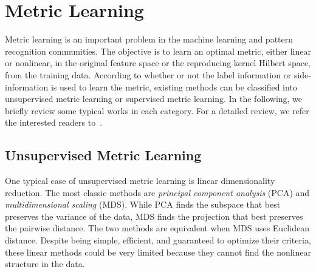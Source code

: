 
\section{Metric Learning}
\label{background:metric}
Metric learning is an important problem in the machine learning and pattern recognition communities. The objective is to learn an optimal metric, either linear or nonlinear, in the original feature space or the reproducing kernel Hilbert
space, from the training data. According to whether or not the label information or side-information is used to learn the metric, existing methods can be classified into unsupervised metric learning or supervised metric learning. In the following, we briefly review some typical works in each category. For a detailed review, we refer the interested readers to~\cite{yang2006tech}.

\subsection{Unsupervised Metric Learning}
One typical case of unsupervised metric learning is linear dimensionality reduction. The most classic methods are \textit{principal component analysis} (\mbox{PCA}) and \textit{multidimensional scaling} (\mbox{MDS}). While \mbox{PCA} finds the subspace that best preserves the variance of the data, \mbox{MDS} finds the projection that best preserves the pairwise distance. The two methods are equivalent when \mbox{MDS} uses Euclidean distance. Despite being simple, efficient, and guaranteed to optimize their criteria, these linear methods could be very limited because they cannot find the nonlinear structure in the data.

